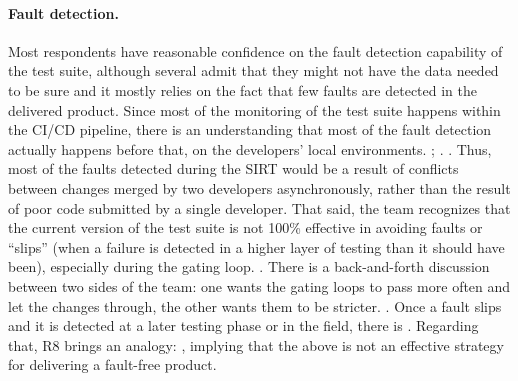 \paragraph{Fault detection.} Most respondents have reasonable confidence on the fault detection capability of the test suite, although several admit that they might not have the data needed to be sure and it mostly relies on the fact that few faults are detected in the delivered product.
Since most of the monitoring of the test suite happens within the CI/CD pipeline, there is an understanding that most of the fault detection actually happens before that, on the developers' local environments.
; .
.
Thus, most of the faults detected during the SIRT would be a result of conflicts between changes merged by two developers asynchronously, rather than the result of poor code submitted by a single developer.
That said, the team recognizes that the current version of the test suite is not 100\% effective in avoiding faults or ``slips'' (when a failure is detected in a higher layer of testing than it should have been), especially during the gating loop.
.
There is a back-and-forth discussion between two sides of the team: one wants the gating loops to pass more often and let the changes through, the other wants them to be stricter.
.
Once a fault slips and it is detected at a later testing phase or in the field, there is .
Regarding that, R8 brings an analogy: , implying that the above is not an effective strategy for delivering a fault-free product.

